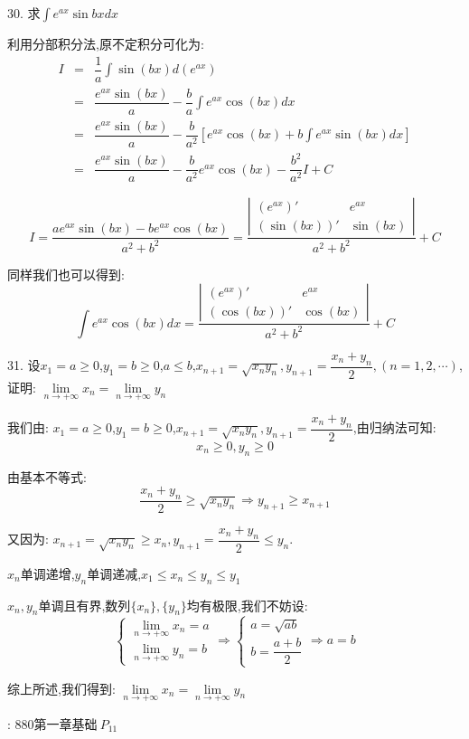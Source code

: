 30. 求$\int e^{ax}\sin bxdx$
\begin{solution}
	
	利用分部积分法,原不定积分可化为:  
	\begin{eqnarray*}
		I&=&\dfrac{1}{a}\int \sin (bx)d(e^{ax})\\
		&=&\dfrac{e^{ax}\sin (bx)}{a}-\dfrac{b}{a}\int e^{ax}\cos(bx)dx\\
		&=&\dfrac{e^{ax}\sin (bx)}{a}-\dfrac{b}{a^2}[e^{ax}\cos (bx)+b\int e^{ax}\sin (bx)dx]\\
		&=&\dfrac{e^{ax}\sin (bx)}{a}-\dfrac{b}{a^2}e^{ax}\cos (bx)-\dfrac{b^2}{a^2}I+C
	\end{eqnarray*}
	
	$$I=\dfrac{ae^{ax}\sin (bx)-be^{ax}\cos (bx)}{a^2+b^2}=\dfrac{\left|\begin{matrix}
			(e^{ax})' & e^{ax}\\(\sin (bx))' & \sin(bx)
		\end{matrix} \right|}{a^2+b^2}+C$$
	
	同样我们也可以得到:  
	$$\int e^{ax}\cos (bx)dx=\dfrac{\left|\begin{matrix}
			(e^{ax})' & e^{ax}\\(\cos (bx))' & \cos(bx)
		\end{matrix} \right|}{a^2+b^2}+C$$
\end{solution}

31. 设$x_{1}=a\geq 0$,$y_{1}=b\geq 0$,$a\leq b$,$x_{n+1}=\sqrt{x_{n}y_{n}},y_{n+1}=\dfrac{x_{n}+y_{n}}{2},(n=1,2,\cdots)$,证明:  $\lim\limits_{n\rightarrow +\infty}x_{n}=\lim\limits_{n\rightarrow +\infty}y_{n}$
\begin{solution}
	
	我们由:  $x_{1}=a\geq 0$,$y_{1}=b\geq 0$,$x_{n+1}=\sqrt{x_{n}y_{n}},y_{n+1}=\dfrac{x_{n}+y_{n}}{2}$,由归纳法可知:  
	$$x_{n}\geq 0, y_{n}\geq 0$$
	
	由基本不等式:  
	$$\dfrac{x_{n}+y_{n}}{2}\geq \sqrt{x_{n}y_{n}}\Rightarrow y_{n+1}\geq x_{n+1}$$
	
	又因为:  $x_{n+1}=\sqrt{x_{n}y_{n}}\geq x_{n}, y_{n+1}=\dfrac{x_{n}+y_{n}}{2}\leq y_{n}$.
	
	$x_{n}$单调递增,$y_{n}$单调递减,$x_{1}\leq x_{n}\leq y_{n}\leq y_{1}$
	
	$x_{n},y_{n}$单调且有界,数列$\{x_{n}\},\{y_{n}\}$均有极限,我们不妨设:  
	$$\left\lbrace
	\begin{array}{l}
		\lim\limits_{n\rightarrow +\infty}x_{n}=a\\
		\lim\limits_{n\rightarrow +\infty}y_{n}=b
	\end{array}
	\right. \Rightarrow \left\lbrace
	\begin{array}{l}
		a=\sqrt{ab}\\
		b=\dfrac{a+b}{2}
	\end{array}
	\right. \Rightarrow a=b$$
	
	综上所述,我们得到:  $\lim\limits_{n\rightarrow +\infty}x_{n}=\lim\limits_{n\rightarrow +\infty}y_{n}$
\end{solution}
\begin{anymark}[注]
	[题目来源]:  $880 \text{第一章基础}\ P_{11}$
\end{anymark}

